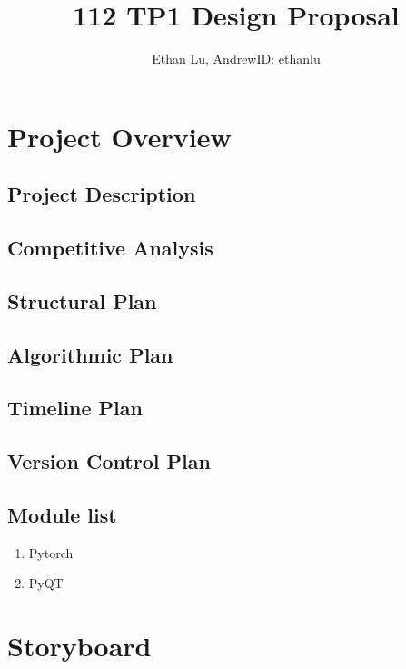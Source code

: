 \documentclass[12pt]{article}
\begin{document}
\title{112 TP1 Design Proposal}
\author{Ethan Lu, AndrewID: ethanlu}
\maketitle
\section{Project Overview}
\subsection{Project Description}
\subsection{Competitive Analysis}
\subsection{Structural Plan}
\subsection{Algorithmic Plan}
\subsection{Timeline Plan}
\subsection{Version Control Plan}
\subsection{Module list}
\begin{enumerate}
\item Pytorch
\item PyQT
\end{enumerate}
\section{Storyboard}
\end{document}
